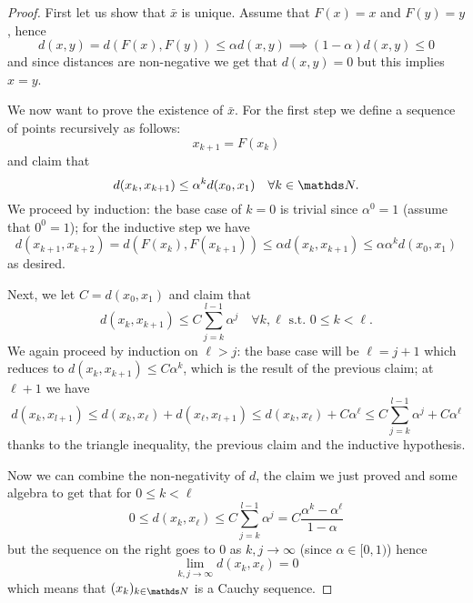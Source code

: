 \documentclass[12pt]{extarticle}
\begin{document}
\begin{proof}
	First let us show that $\bar x$ is unique.
	Assume that $F(x) = x$ and $F(y) = y$, hence
	\begin{equation}
		d(x, y) = d(F(x), F(y)) \leq \alpha d(x, y) \implies (1-\alpha) d(x, y) \leq 0
	\end{equation}
	and since distances are non-negative we get that $d(x, y) = 0$ but this implies $x = y$.

	We now want to prove the existence of $\bar x$.
	For the first step we define a sequence of points recursively as follows:
	\begin{equation}
		x_{k + 1} = F(x_k)
	\end{equation}
	and claim that
	\begin{equation}
		d(x_k, x_{k+1}) \leq \alpha^k d(x_0, x_1) \quad \forall k \in \N .
	\end{equation}
	We proceed by induction: the base case of $k = 0$ is trivial since $\alpha^0 = 1$ (assume that $0^0=1$);
	for the inductive step we have
	\begin{equation}
		d(x_{k+1}, x_{k+2}) = d(F(x_k), F(x_{k+1})) \leq \alpha d(x_k, x_{k+1}) \leq \alpha \alpha^k d(x_0, x_1)
	\end{equation}
	as desired.

	Next, we let $C = d(x_0, x_1)$ and claim that
	\begin{equation}
		d(x_k, x_{k+1}) \leq C \sum_{j = k}^{l-1} \alpha^j \quad \forall k, \ell \text{ s.t. } 0 \leq k < \ell.
	\end{equation}
	We again proceed by induction on $\ell > j$:
	the base case will be $\ell = j + 1$ which reduces to $d(x_k, x_{k+1}) \leq C \alpha^k$, which is the result of the previous claim;
	at $\ell + 1$ we have
	\begin{equation}
		d(x_k, x_{l+1}) \leq d(x_k, x_\ell) + d(x_\ell, x_{l + 1}) \leq d(x_k, x_\ell) + C \alpha^\ell \leq C\sum_{j = k}^{l-1} \alpha^j + C \alpha^\ell
	\end{equation}
	thanks to the triangle inequality, the previous claim and the inductive hypothesis.

	Now we can combine the non-negativity of $d$, the claim we just proved and some algebra to get that for $0 \leq k < \ell$
	\begin{equation}
		0 \leq d(x_k, x_\ell) \leq C \sum_{j = k}^{l-1} \alpha^j = C \frac{\alpha^k - \alpha^\ell}{1-\alpha}
	\end{equation}
	but the sequence on the right goes to $0$ as $k, j \to \infty$ (since $\alpha \in [0, 1)$) hence
	\begin{equation}
		\lim_{k, j \to \infty} d(x_k, x_{\ell}) = 0
	\end{equation}
	which means that $(x_k)_{k \in \N}$ is a Cauchy sequence.


\end{proof}
\end{document}
